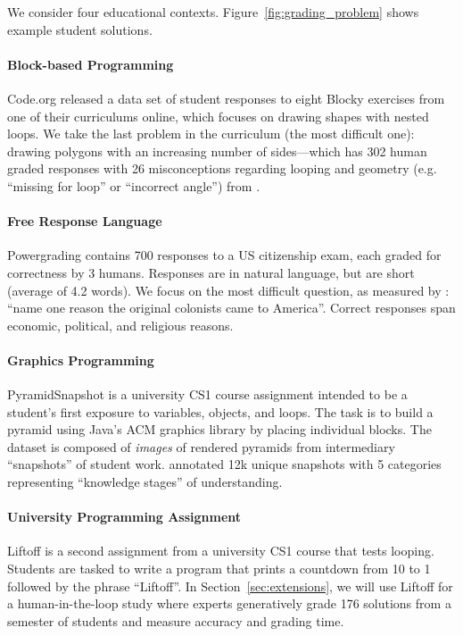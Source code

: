 We consider four educational contexts. Figure~\ref{fig:grading_problem} shows example student solutions.

\paragraph{Block-based Programming}  Code.org released a data set of student responses to eight Blocky  exercises from one of their curriculums online, which focuses on drawing shapes with nested loops. We take the last problem in the curriculum (the most difficult one): drawing polygons with an increasing number of sides---which has 302 human graded responses with 26 misconceptions regarding looping and geometry (e.g. ``missing for loop'' or ``incorrect angle'') from \cite{wu2018zero}.

\paragraph{Free Response Language}  Powergrading \cite{basu2013powergrading} contains 700 responses to a US citizenship exam, each graded for correctness by 3 humans. Responses are in natural language, but are  short (average of 4.2 words). We focus on the most difficult question, as measured by \cite{riordan2017investigating}: ``name one reason the original colonists came to America''. Correct responses span economic, political, and religious reasons. 

\paragraph{Graphics Programming}  PyramidSnapshot is a university CS1 course assignment intended to be a student's first exposure to variables, objects, and loops. The task is to build a pyramid using Java's ACM graphics library by placing individual blocks. The dataset is composed of \textit{images} of rendered pyramids from intermediary ``snapshots'' of student work. \cite{yan_pyramid} annotated 12k unique snapshots with 5 categories representing ``knowledge stages'' of understanding.

\paragraph{University Programming Assignment}  Liftoff is a second assignment from a university CS1 course that tests looping. Students are tasked to write a program that prints a countdown from 10 to 1 followed by the phrase ``Liftoff''. In Section~\ref{sec:extensions}, we will use Liftoff for a human-in-the-loop study where experts generatively grade 176 solutions from a semester of students and measure accuracy and grading time.

